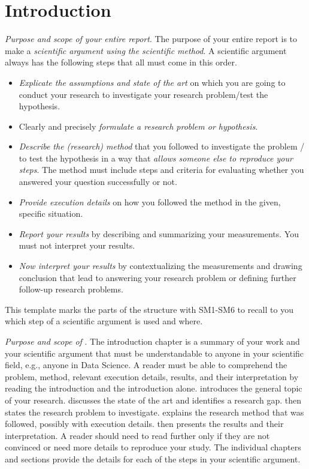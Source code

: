 \chapter{Introduction}\label{sec:introduction}

\emph{Purpose and scope of your entire report}.
The purpose of your entire report is to make a \emph{scientific argument using the scientific method}.
A scientific argument always has the following steps that all must come in this order.
%
\begin{itemize}
  \item[SM1] \emph{Explicate the assumptions and state of the art} on which you are going to conduct your research to investigate your research problem/test the hypothesis.
  \item[SM2] Clearly and precisely \emph{formulate a research problem or hypothesis}.
  \item[SM3] \emph{Describe the (research) method} that you followed to investigate the problem / to test the hypothesis in a way that \emph{allows someone else to reproduce your steps}.
        The method must include steps and criteria for evaluating whether you answered your question successfully or not.
  \item[SM4] \emph{Provide execution details} on how you followed the method in the given, specific situation.
  \item[SM5] \emph{Report your results} by describing and summarizing your measurements.
        You must not interpret your results.
  \item[SM6] \emph{Now interpret your results} by contextualizing the measurements and drawing conclusion that lead to answering your research problem or defining further follow-up research problems.
\end{itemize}
%
This template marks the parts of the structure with SM1-SM6 to recall to you which step of a scientific argument is used and where.

\emph{Purpose and scope of }.
The introduction chapter is a summary of your work and your scientific argument that must be understandable to anyone in your scientific field, e.g., anyone in Data Science.
A reader must be able to comprehend the problem, method, relevant execution details, results, and their interpretation by reading the introduction and the introduction alone.
 introduces the general topic of your research.
 discusses the state of the art and identifies a research gap.
 then states the research problem to investigate.
 explains the research method that was followed, possibly with execution details.
 then presents the results and their interpretation.
A reader should need to read further only if they are not convinced or need more details to reproduce your study.
The individual chapters and sections provide the details for each of the steps in your scientific argument.

